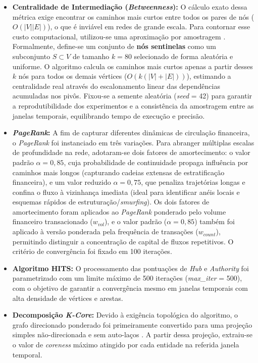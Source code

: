 \documentclass[titlepage,a4paper,oneside,onecolumn,12pt]{report}
\begin{document}
\begin{itemize}

    \item \textbf{Centralidade de Intermediação (\textit{Betweenness}):} O cálculo exato dessa métrica exige encontrar os caminhos mais curtos entre todos os pares de nós ($O(|V||E|)$), o que é inviável em redes de grande escala. Para contornar esse custo computacional, utilizou-se uma aproximação por amostragem \cite{riondato2016fast}. Formalmente, define-se um conjunto de \textbf{nós sentinelas} como um subconjunto $S \subset V$ de tamanho $k = 80$ selecionado de forma aleatória e uniforme. O algoritmo calcula os caminhos mais curtos apenas a partir desses $k$ nós para todos os demais vértices ($O(k(|V|+|E|))$), estimando a centralidade real através do escalonamento linear das dependências acumuladas nos pivôs. Fixou-se a semente aleatória (\textit{seed} = 42) para garantir a reprodutibilidade dos experimentos e a consistência da amostragem entre as janelas temporais, equilibrando tempo de execução e precisão.
    
    \item \textbf{\textit{PageRank}:} A fim de capturar diferentes dinâmicas de circulação financeira, o \textit{PageRank} foi instanciado em três variações. Para abranger múltiplas escalas de profundidade na rede, adotaram-se dois fatores de amortecimento: o valor padrão $\alpha=0{,}85$, cuja probabilidade de continuidade propaga influência por caminhos mais longos (capturando cadeias extensas de estratificação financeira), e um valor reduzido $\alpha=0{,}75$, que penaliza trajetórias longas e confina o fluxo à vizinhança imediata (ideal para identificar anéis locais e esquemas rápidos de estruturação/\textit{smurfing}). Os dois fatores de amortecimento foram aplicados ao \textit{PageRank} ponderado pelo volume financeiro transacionado ($w_{vol}$), e o valor padrão ($\alpha=0{,}85$) também foi aplicado à versão ponderada pela frequência de transações ($w_{count}$), permitindo distinguir a concentração de capital de fluxos repetitivos. O critério de convergência foi fixado em 100 iterações.
    
    \item \textbf{Algoritmo HITS:} O processamento das pontuações de \textit{Hub} e \textit{Authority} foi parametrizado com um limite máximo de 500 iterações (\textit{max\_iter} = 500), com o objetivo de garantir a convergência mesmo em janelas temporais com alta densidade de vértices e arestas.
    
    \item \textbf{Decomposição \textit{K-Core}:} Devido à exigência topológica do algoritmo, o grafo direcionado ponderado foi primeiramente convertido para uma projeção simples não-direcionada e sem auto-laços \cite{shin2018patterns}. A partir dessa projeção, extraiu-se o valor de \textit{coreness} máximo atingido por cada entidade na referida janela temporal.
\end{itemize}
\end{document}
